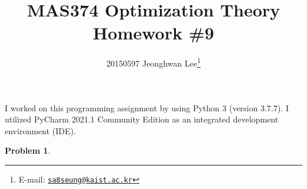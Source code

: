 \documentclass[11pt]{article}
\newtheorem{problem}{Problem}
\begin{document}
 
\title{MAS374 Optimization Theory\\ Homework \#9}
\author{20150597 Jeonghwan Lee\footnote{E-mail: \href{mailto:sa8seung@kaist.ac.kr}{\texttt{sa8seung@kaist.ac.kr}}}}

\maketitle

I worked on this programming assignment by using Python 3 (version 3.7.7). I utilized PyCharm 2021.1 Community Edition as an integrated development environment (IDE).

\begin{problem}
\label{problem1}
\end{problem}
\end{document}
